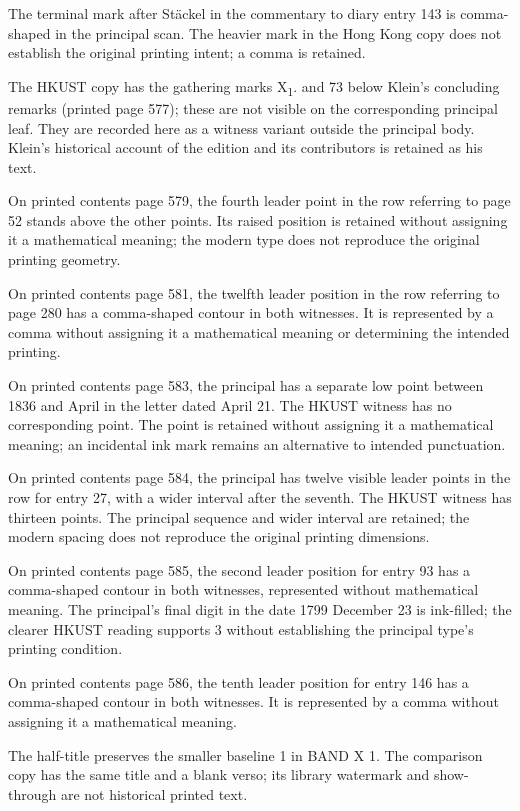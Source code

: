 The terminal mark after Stäckel in the commentary to diary entry 143 is comma-shaped in the principal scan. The heavier mark in the Hong Kong copy does not establish the original printing intent; a comma is retained.

The HKUST copy has the gathering marks \textnormal{X\textsubscript{1}.} and \textnormal{73} below Klein’s concluding remarks (printed page 577); these are not visible on the corresponding principal leaf. They are recorded here as a witness variant outside the principal body. Klein’s historical account of the edition and its contributors is retained as his text.

On printed contents page 579, the fourth leader point in the row referring to page 52 stands above the other points. Its raised position is retained without assigning it a mathematical meaning; the modern type does not reproduce the original printing geometry.

On printed contents page 581, the twelfth leader position in the row referring to page 280 has a comma-shaped contour in both witnesses. It is represented by a comma without assigning it a mathematical meaning or determining the intended printing.

On printed contents page 583, the principal has a separate low point between 1836 and April in the letter dated April 21. The HKUST witness has no corresponding point. The point is retained without assigning it a mathematical meaning; an incidental ink mark remains an alternative to intended punctuation.

On printed contents page 584, the principal has twelve visible leader points in the row for entry 27, with a wider interval after the seventh. The HKUST witness has thirteen points. The principal sequence and wider interval are retained; the modern spacing does not reproduce the original printing dimensions.

On printed contents page 585, the second leader position for entry 93 has a comma-shaped contour in both witnesses, represented without mathematical meaning. The principal’s final digit in the date 1799 December 23 is ink-filled; the clearer HKUST reading supports 3 without establishing the principal type’s printing condition.

On printed contents page 586, the tenth leader position for entry 146 has a comma-shaped contour in both witnesses. It is represented by a comma without assigning it a mathematical meaning.

The half-title preserves the smaller baseline 1 in BAND X 1. The comparison copy has the same title and a blank verso; its library watermark and show-through are not historical printed text.

